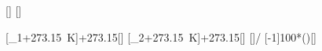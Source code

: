 [\degreeCelsius]
[\degreeCelsius]

[\vartheta_1+\SI{273.15}{\kelvin}]{\thAX+273.15}[\kelvin]
[\vartheta_2+\SI{273.15}{\kelvin}]{\thBX+273.15}[\kelvin]
[]{\TBX/\TAX}
[-1]{100*()}[\percent]
